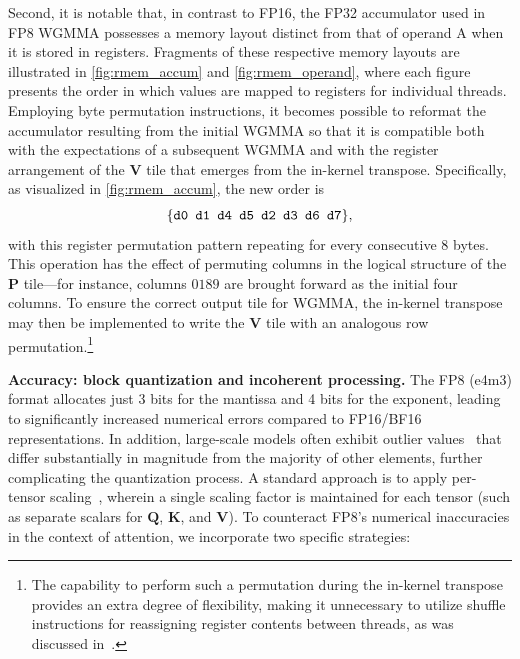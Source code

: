 Second, it is notable that, in contrast to FP16, the FP32 accumulator used in FP8 WGMMA possesses a memory layout distinct from that of operand A when it is stored in registers. Fragments of these respective memory layouts are illustrated in \cref{fig:rmem_accum} and \cref{fig:rmem_operand}, where each figure presents the order in which values are mapped to registers for individual threads. Employing byte permutation instructions, it becomes possible to reformat the accumulator resulting from the initial WGMMA so that it is compatible both with the expectations of a subsequent WGMMA and with the register arrangement of the $\mathbf{V}$ tile that emerges from the in-kernel transpose. Specifically, as visualized in \cref{fig:rmem_accum}, the new order is
$$\{ \verb|d0 d1 d4 d5 d2 d3 d6 d7| \},$$
with this register permutation pattern repeating for every consecutive 8 bytes. This operation has the effect of permuting columns in the logical structure of the $\mathbf{P}$ tile—for instance, columns $0189$ are brought forward as the initial four columns. To ensure the correct output tile for WGMMA, the in-kernel transpose may then be implemented to write the $\mathbf{V}$ tile with an analogous row permutation.\footnote{The capability to perform such a permutation during the in-kernel transpose provides an extra degree of flexibility, making it unnecessary to utilize shuffle instructions for reassigning register contents between threads, as was discussed in~\citep{colfax_fp8_flashattention_2024}.}

\textbf{Accuracy: block quantization and incoherent processing.} The FP8 (e4m3) format allocates just 3 bits for the mantissa and 4 bits for the exponent, leading to significantly increased numerical errors compared to FP16/BF16 representations. In addition, large-scale models often exhibit outlier values~\citep{dettmers2208llm,
  sun2024massive} that differ substantially in magnitude from the majority of other elements, further complicating the quantization process. A standard approach is to apply per-tensor scaling~\citep{micikevicius2022fp8}, wherein a single scaling factor is maintained for each tensor (such as separate scalars for $\mathbf{Q}$, $\mathbf{K}$, and $\mathbf{V}$).
To counteract FP8’s numerical inaccuracies in the context of attention, we incorporate two specific strategies:

